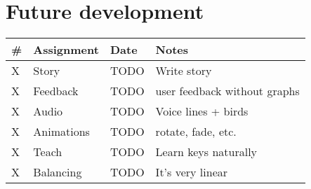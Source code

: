 \documentclass[12pt, letterpaper]{article}
\begin{document}
\section{Future development}
\bgroup
\def\arraystretch{1.5}
\begin{tabular}{ R{0.4cm} p{4cm} p{1.5cm} p{5.5cm} }
\toprule
{} & \textbf{Assignment} & \textbf{Date} & \textbf{Notes} \\ 
\midrule

X & Story & TODO & Write story \\
X & Feedback & TODO & user feedback without graphs \\
X & Audio & TODO & Voice lines + birds \\
X & Animations & TODO & rotate, fade, etc. \\
X & Teach & TODO & Learn keys naturally \\
X & Balancing & TODO & It's very linear \\

\bottomrule
\end{tabular}
\egroup


\end{document}
